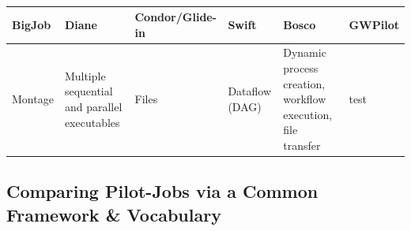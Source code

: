\documentclass{sig-alternate}
\begin{document}
\begin{landscape}
\begin{table}
\begin{center}
\begin{footnotesize}
\begin{tabular}{|p{3.0cm}|p{3.5cm}|p{2.3cm}|p{1.9cm}|p{3.7cm}|p{2.5cm}|}
\hline {\bf BigJob}
& {\bf Diane}
& {\bf Condor/Glide-in}
& {\bf Swift}
& {\bf Bosco}
& {\bf GWPilot}
\\
\hline

Montage
& Multiple sequential and parallel executables
& Files
& Dataflow (DAG)
& Dynamic process creation, workflow execution, file transfer
& test
\\
\hline

\end{tabular}
\end{footnotesize}
\caption{\label{Tab:AppChars} }
\end{center}
\end{table}
\end{landscape}


\subsection{Comparing Pilot-Jobs via a Common Framework \& Vocabulary}

\end{document}
